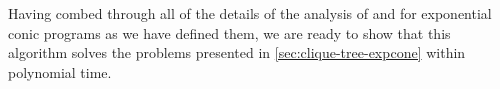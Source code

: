 
Having combed through all of the details of the analysis of  \textcite{badenbroek2021algorithm} and \textcite{nesterov1996infeasible} for exponential
conic programs as we have defined them, we are ready to show that this algorithm solves the problems presented in \cref{sec:clique-tree-expcone} within polynomial time. 

